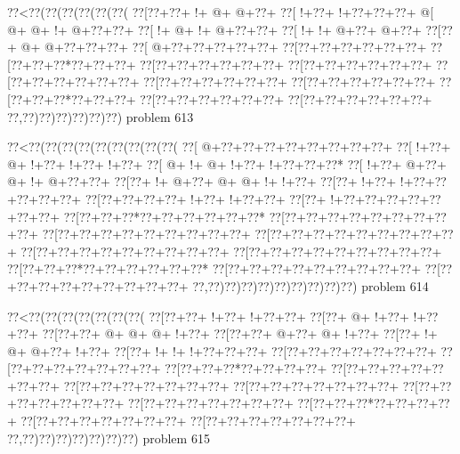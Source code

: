 \vbox{\vbox{\goo
\0??<\0??(\0??(\0??(\0??(\0??(\0??(
\0??[\0??+\0??+\- !+\- @+\- @+\0??+
\0??[\- !+\0??+\- !+\0??+\0??+\0??+
\- @[\- @+\- @+\- !+\- @+\0??+\0??+
\0??[\- !+\- @+\- !+\- @+\0??+\0??+
\0??[\- !+\- !+\- @+\0??+\- @+\0??+
\0??[\0??+\- @+\- @+\0??+\0??+\0??+
\0??[\- @+\0??+\0??+\0??+\0??+\0??+
\0??[\0??+\0??+\0??+\0??+\0??+\0??+
\0??[\0??+\0??+\0??*\0??+\0??+\0??+
\0??[\0??+\0??+\0??+\0??+\0??+\0??+
\0??[\0??+\0??+\0??+\0??+\0??+\0??+
\0??[\0??+\0??+\0??+\0??+\0??+\0??+
\0??[\0??+\0??+\0??+\0??+\0??+\0??+
\0??[\0??+\0??+\0??+\0??+\0??+\0??+
\0??[\0??+\0??+\0??*\0??+\0??+\0??+
\0??[\0??+\0??+\0??+\0??+\0??+\0??+
\0??[\0??+\0??+\0??+\0??+\0??+\0??+
\0??,\0??)\0??)\0??)\0??)\0??)\0??)
}
\hfil problem 613\hfil\break
}

\vbox{\vbox{\goo
\0??<\0??(\0??(\0??(\0??(\0??(\0??(\0??(\0??(\0??(
\0??[\- @+\0??+\0??+\0??+\0??+\0??+\0??+\0??+\0??+
\0??[\- !+\0??+\- @+\- !+\0??+\- !+\0??+\- !+\0??+
\0??[\- @+\- !+\- @+\- !+\0??+\- !+\0??+\0??+\0??*
\0??[\- !+\0??+\- @+\0??+\- @+\- !+\- @+\0??+\0??+
\0??[\0??+\- !+\- @+\0??+\- @+\- @+\- !+\- !+\0??+
\0??[\0??+\- !+\0??+\- !+\0??+\0??+\0??+\0??+\0??+
\0??[\0??+\0??+\0??+\0??+\- !+\0??+\- !+\0??+\0??+
\0??[\0??+\- !+\0??+\0??+\0??+\0??+\0??+\0??+\0??+
\0??[\0??+\0??+\0??*\0??+\0??+\0??+\0??+\0??+\0??*
\0??[\0??+\0??+\0??+\0??+\0??+\0??+\0??+\0??+\0??+
\0??[\0??+\0??+\0??+\0??+\0??+\0??+\0??+\0??+\0??+
\0??[\0??+\0??+\0??+\0??+\0??+\0??+\0??+\0??+\0??+
\0??[\0??+\0??+\0??+\0??+\0??+\0??+\0??+\0??+\0??+
\0??[\0??+\0??+\0??+\0??+\0??+\0??+\0??+\0??+\0??+
\0??[\0??+\0??+\0??*\0??+\0??+\0??+\0??+\0??+\0??*
\0??[\0??+\0??+\0??+\0??+\0??+\0??+\0??+\0??+\0??+
\0??[\0??+\0??+\0??+\0??+\0??+\0??+\0??+\0??+\0??+
\0??,\0??)\0??)\0??)\0??)\0??)\0??)\0??)\0??)\0??)
}
\hfil problem 614\hfil\break
}

\vbox{\vbox{\goo
\0??<\0??(\0??(\0??(\0??(\0??(\0??(\0??(
\0??[\0??+\0??+\- !+\0??+\- !+\0??+\0??+
\0??[\0??+\- @+\- !+\0??+\- !+\0??+\0??+
\0??[\0??+\0??+\- @+\- @+\- @+\- !+\0??+
\0??[\0??+\0??+\- @+\0??+\- @+\- !+\0??+
\0??[\0??+\- !+\- @+\- @+\0??+\- !+\0??+
\0??[\0??+\- !+\- !+\- !+\0??+\0??+\0??+
\0??[\0??+\0??+\0??+\0??+\0??+\0??+\0??+
\0??[\0??+\0??+\0??+\0??+\0??+\0??+\0??+
\0??[\0??+\0??+\0??*\0??+\0??+\0??+\0??+
\0??[\0??+\0??+\0??+\0??+\0??+\0??+\0??+
\0??[\0??+\0??+\0??+\0??+\0??+\0??+\0??+
\0??[\0??+\0??+\0??+\0??+\0??+\0??+\0??+
\0??[\0??+\0??+\0??+\0??+\0??+\0??+\0??+
\0??[\0??+\0??+\0??+\0??+\0??+\0??+\0??+
\0??[\0??+\0??+\0??*\0??+\0??+\0??+\0??+
\0??[\0??+\0??+\0??+\0??+\0??+\0??+\0??+
\0??[\0??+\0??+\0??+\0??+\0??+\0??+\0??+
\0??,\0??)\0??)\0??)\0??)\0??)\0??)\0??)
}
\hfil problem 615\hfil\break
}

